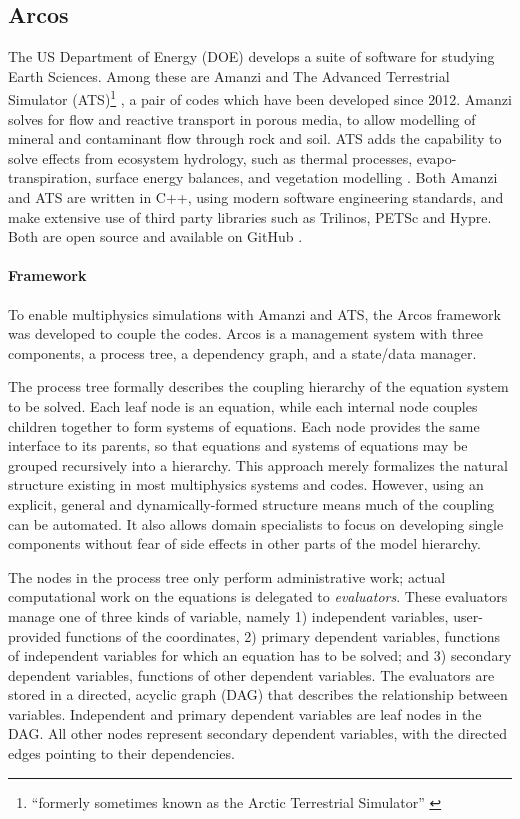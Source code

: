 \subsection{Arcos}\label{sec:arcos}

The US Department of Energy (DOE) develops a suite of software for studying Earth Sciences.
Among these are Amanzi \cite{Mo14Aman,amanzi_repo} and The Advanced Terrestrial Simulator (ATS)\footnote{``formerly sometimes known as the Arctic Terrestrial Simulator'' \cite{ats_repo}} \cite{ats_repo}, a pair of codes which have been developed since 2012.
Amanzi solves for flow and reactive transport in porous media, to allow modelling of mineral and contaminant flow through rock and soil.
ATS adds the capability to solve effects from ecosystem hydrology, such as thermal processes, evapo-transpiration, surface energy balances, and vegetation modelling \cite{ats_repo}.
Both Amanzi and ATS are written in C++, using modern software engineering standards, and make extensive use of third party libraries such as Trilinos, PETSc and Hypre.
Both are open source and available on GitHub \cite{amanzi_repo,ats_repo}.

\paragraph{Framework}
To enable multiphysics simulations with Amanzi and ATS, the Arcos framework \cite{Co16Mana} was developed to couple the codes.
Arcos is a management system with three components, a process tree, a dependency graph, and a state/data manager.

The process tree formally describes the coupling hierarchy of the equation system to be solved.
Each leaf node is an equation, while each internal node couples children together to form systems of equations.
Each node provides the same interface to its parents, so that equations and systems of equations may be grouped recursively into a hierarchy.
This approach merely formalizes the natural structure existing in most multiphysics systems and codes.
However, using an explicit, general and dynamically-formed structure means much of the coupling can be automated.
It also allows domain specialists to focus on developing single components without fear of side effects in other parts of the model hierarchy.

The nodes in the process tree only perform administrative work;
actual computational work on the equations is delegated to \emph{evaluators}.
These evaluators manage one of three kinds of variable, namely
1) independent variables, user-provided functions of the coordinates,
2) primary dependent variables, functions of independent variables for which an equation has to be solved; and
3) secondary dependent variables, functions of other dependent variables.
The evaluators are stored in a directed, acyclic graph (DAG) that describes the relationship between variables.
Independent and primary dependent variables are leaf nodes in the DAG.
All other nodes represent secondary dependent variables, with the directed edges pointing to their dependencies.

